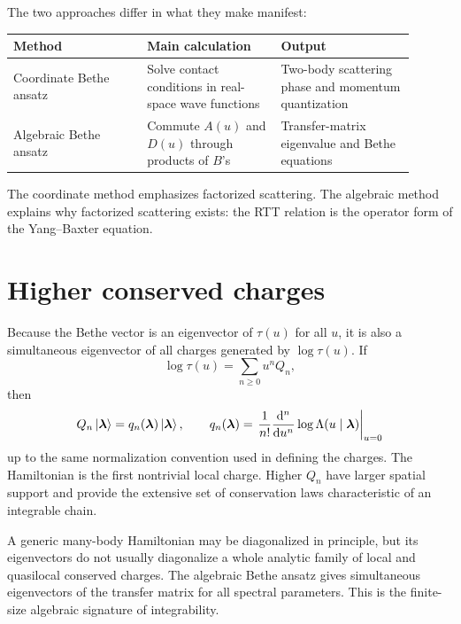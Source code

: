 The two approaches differ in what they make manifest:
\begin{center}
\begin{tabular}{@{}L{0.30\linewidth}L{0.30\linewidth}L{0.30\linewidth}@{}}
\toprule
Method & Main calculation & Output \\
\midrule
Coordinate Bethe ansatz & Solve contact conditions in real-space wave functions & Two-body scattering phase and momentum quantization \\
Algebraic Bethe ansatz & Commute $A(u)$ and $D(u)$ through products of $B$'s & Transfer-matrix eigenvalue and Bethe equations \\
\bottomrule
\end{tabular}
\end{center}
The coordinate method emphasizes factorized scattering.  The algebraic method
explains why factorized scattering exists: the RTT relation is the operator form
of the Yang--Baxter equation.

\section{Higher conserved charges}
\label{sec:aba-higher-conserved-charges}

Because the Bethe vector is an eigenvector of $\tau(u)$ for all $u$, it is also a
simultaneous eigenvector of all charges generated by $\log\tau(u)$.  If
\begin{equation}
\label{eq:aba-log-transfer-charge-expansion}
    \log\tau(u)=\sum_{n\geq0}u^n Q_n,
\end{equation}
then
\begin{equation}
\label{eq:aba-charge-eigenvalues}
    Q_n\left|\boldsymbol{\lambda}\right\rangle
    =q_n(\boldsymbol{\lambda})\left|\boldsymbol{\lambda}\right\rangle,
    \qquad
    q_n(\boldsymbol{\lambda})
    =
    \left.
    \frac{1}{n!}
    \frac{\mathrm{d}^n}{\mathrm{d} u^n}
    \log\Lambda(u\mid\boldsymbol{\lambda})
    \right|_{u=0}
\end{equation}
up to the same normalization convention used in defining the charges.  The
Hamiltonian is the first nontrivial local charge.  Higher $Q_n$ have larger
spatial support and provide the extensive set of conservation laws characteristic
of an integrable chain.

\begin{remark}
A generic many-body Hamiltonian may be diagonalized in principle, but its
eigenvectors do not usually diagonalize a whole analytic family of local and
quasilocal conserved charges.  The algebraic Bethe ansatz gives simultaneous
eigenvectors of the transfer matrix for all spectral parameters.  This is the
finite-size algebraic signature of integrability.
\end{remark}

